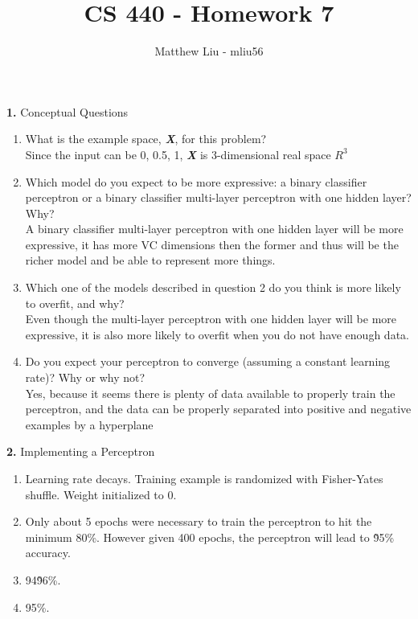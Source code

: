 \documentclass[titlepage]{article}
\title{CS 440 - Homework 7}
\author{Matthew Liu - mliu56}
\date{}
\begin{document}
\maketitle{}

\noindent \textbf{1. } Conceptual Questions \\

\begin{enumerate}
	\item What is the example space, \textbf{\textit{X}}, for this problem? \\
	Since the input can be {0, 0.5, 1}, \textbf{\textit{X}} is 3-dimensional real space $R^3$
	\item Which model do you expect to be more expressive: a binary classifier perceptron or a binary classifier multi-layer perceptron with one hidden layer? Why? \\
	A binary classifier multi-layer perceptron with one hidden layer will be more expressive, it has more VC dimensions then the former and thus will be the richer model and be able to represent more things.
	\item Which one of the models described in question 2 do you think is more likely to overfit, and why? \\
	Even though the multi-layer perceptron with one hidden layer will be more expressive, it is also more likely to overfit when you do not have enough data.
	\item Do you expect your perceptron to converge (assuming a constant learning rate)? Why or why not? \\
	Yes, because it seems there is plenty of data available to properly train the perceptron, and the data can be properly separated into positive and negative examples by a hyperplane
\end{enumerate}

\pagebreak

\noindent \textbf{2. } Implementing a Perceptron \\

\begin{enumerate}
	\item Learning rate decays. Training example is randomized with Fisher-Yates shuffle. Weight initialized to 0.
	\item Only about 5 epochs were necessary to train the perceptron to hit the minimum 80\%. However given 400 epochs, the perceptron will lead to \~95\% accuracy.
	\item 94\~96\%.
	\item 95\%.
\end{enumerate}
\end{document}
